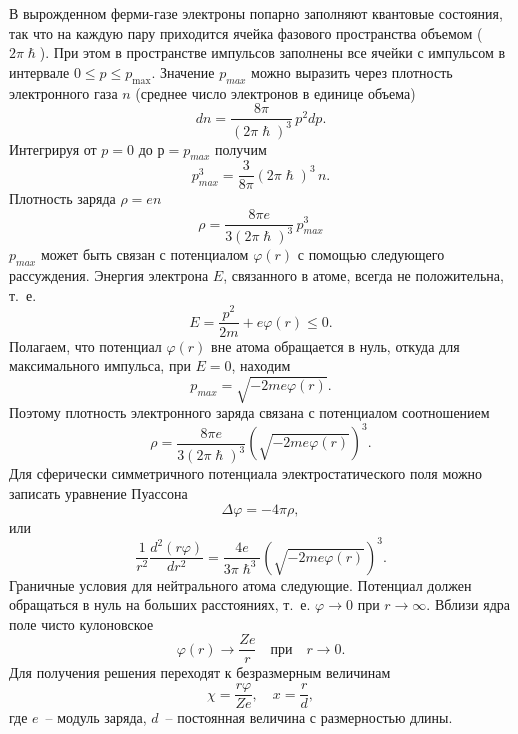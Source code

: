 \documentclass[a4paper,14pt, openany, twoside, draft]{extbook} %
\begin{document}
В вырожденном ферми-газе электроны попарно заполняют квантовые состояния, так что на каждую пару приходится ячейка фазового пространства объемом ($2\pi \hslash$).  При этом в пространстве импульсов заполнены все ячейки с импульсом в интервале  $0\le p\le p_{\text{max}}$.  Значение $p_{max}$ можно выразить через плотность электронного газа $n$ (среднее число электронов в единице объема)
\begin{equation*}
\label{eq:impuls}
dn=\frac{8\pi}{(2\pi \hslash)^3}\,p^2dp.
\end{equation*}
Интегрируя от $p=0$ до $р=p_{max}$ получим
\begin{equation*}
\label{eq:impuls2}
p_{max}^3=\frac{3}{8\pi}(2\pi \hslash)^3\,n.
\end{equation*}
Плотность заряда ${\rho}=en$
\begin{equation*}
\label{eq:density}
\rho =\frac{8\pi e}{3(2\pi \hslash)^3}\,p_{max}^3
\end{equation*}
$p_{max}$ может быть связан с потенциалом $\varphi (r)$ с помощью следующего рассуждения.  Энергия электрона $E$, связанного в атоме, всегда не положительна, т.~е.
\begin{equation*}
\label{eq:elektronenergy}
E=\frac{p^2}{2m}+\mathit{e\varphi} (r)\le 0.
\end{equation*}
Полагаем, что потенциал $\varphi (r)$ вне атома обращается в нуль, откуда для максимального импульса, при $E=0$, находим
\begin{equation*}
\label{eq:maximpuls}
p_{max}=\sqrt{-2me\varphi (r)}.
\end{equation*}
Поэтому плотность электронного заряда связана с потенциалом соотношением
\begin{equation*}
\label{eq:density1}
\rho=\frac{8\mathit{\pi e}}{3(2\pi \hslash)^3}\left(\sqrt{-2me\varphi (r)}\right)^3.
\end{equation*}
Для сферически симметричного потенциала электростатического поля можно записать уравнение Пуассона
\begin{equation*}
\label{eq:puasson}
\Delta \varphi=-4\pi \rho,
\end{equation*}
или
\begin{equation*}
\label{eq:puasson1}
\frac{1}{r^2}\frac{d^2(\mathit{r\varphi})}{dr^2}=\frac{4e}{3\pi \hslash^3}\left(\sqrt{-2me\varphi (r)}\right)^3.
\end{equation*}
Граничные условия для нейтрального атома следующие.  Потенциал должен обращаться в нуль на больших расстояниях, т.~е. $\varphi \rightarrow 0$ при $r\rightarrow \infty$.  Вблизи ядра поле чисто кулоновское
\begin{equation*}
\label{eq:kulonfield}
\varphi (r)\rightarrow \frac{Ze}{r}\quad\text{при}\quad r\rightarrow 0.
\end{equation*}
Для получения решения переходят к безразмерным величинам
\begin{equation*}
\label{eq:kulonfield}
\chi=\frac{\mathit{r\varphi}}{Ze},\quad x=\frac{r}{d},
\end{equation*}
где $e$~-- модуль заряда, $d$~-- постоянная величина с размерностью длины.
\end{document}
